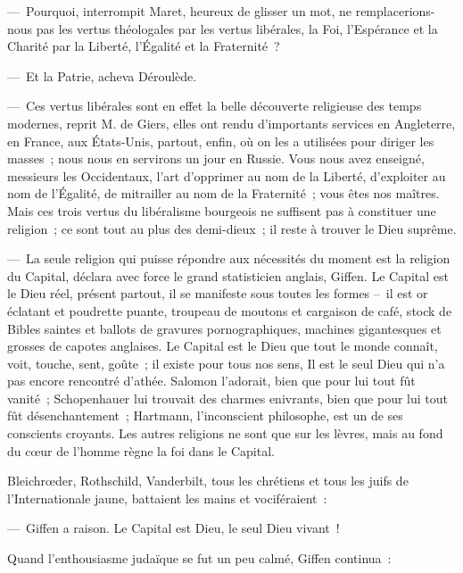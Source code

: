 \documentclass[french,twoside]{book} %
\begin{document}
— Pourquoi, interrompit Maret, heureux de glisser un mot, ne remplacerions-nous pas les vertus théologales par les vertus libérales, la Foi, l’Espérance et la Charité par la Liberté, l’Égalité et la Fraternité ?\par
— Et la Patrie, acheva Déroulède.\par
— Ces vertus libérales sont en effet la belle découverte religieuse des temps modernes, reprit M. de Giers, elles ont rendu d’importants services en Angleterre, en France, aux États-Unis, partout, enfin, où on les a utilisées pour diriger les masses ; nous nous en servirons un jour en Russie. Vous nous avez enseigné, messieurs les Occidentaux, l’art d’opprimer au nom de la Liberté, d’exploiter au nom de l’Égalité, de mitrailler au nom de la Fraternité ; vous êtes nos maîtres. Mais ces trois vertus du libéralisme bourgeois ne suffisent pas à constituer une religion ; ce sont tout au plus des demi-dieux ; il reste à trouver le Dieu suprême.\par
— La seule religion qui puisse répondre aux nécessités du moment est la religion du Capital, déclara avec force le grand statisticien anglais, Giffen. Le Capital est le Dieu réel, présent partout, il se manifeste sous toutes les formes – il est or éclatant et poudrette puante, troupeau de moutons et cargaison de café, stock de Bibles saintes et ballots de gravures pornographiques, machines gigantesques et grosses de capotes anglaises. Le Capital est le Dieu que tout le monde connaît, voit, touche, sent, goûte ; il existe pour tous nos sens, Il est le seul Dieu qui n’a pas encore rencontré d’athée. Salomon l’adorait, bien que pour lui tout fût vanité ; Schopenhauer lui trouvait des charmes enivrants, bien que pour lui tout fût désenchantement ; Hartmann, l’inconscient philosophe, est un de ses conscients croyants. Les autres religions ne sont que sur les lèvres, mais au fond du cœur de l’homme règne la foi dans le Capital.\par
Bleichrœder, Rothschild, Vanderbilt, tous les chrétiens et tous les juifs de l’Internationale jaune, battaient les mains et vociféraient :\par
— Giffen a raison. Le Capital est Dieu, le seul Dieu vivant !\par
Quand l’enthousiasme judaïque se fut un peu calmé, Giffen continua :\par
\end{document}
